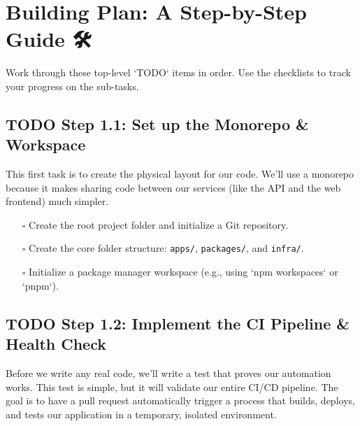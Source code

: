 \documentclass[11pt]{article}
\begin{document}
\section{Building Plan: A Step-by-Step Guide 🛠️}
\label{sec:org284168a}
Work through these top-level `TODO` items in order. Use the checklists to track your progress on the sub-tasks.
\subsection{{\bfseries\sffamily TODO} Step 1.1: Set up the Monorepo \& Workspace}
\label{sec:org1297e74}
This first task is to create the physical layout for our code. We'll use a monorepo because it makes sharing code between our services (like the API and the web frontend) much simpler.

\begin{itemize}
\item[{$\square$}] Create the root project folder and initialize a Git repository.
\item[{$\square$}] Create the core folder structure: \texttt{apps/}, \texttt{packages/}, and \texttt{infra/}.
\item[{$\square$}] Initialize a package manager workspace (e.g., using `npm workspaces` or `pnpm`).
\end{itemize}
\subsection{{\bfseries\sffamily TODO} Step 1.2: Implement the CI Pipeline \& Health Check}
\label{sec:org57ac915}
Before we write any real code, we'll write a test that proves our automation works. This test is simple, but it will validate our entire CI/CD pipeline. The goal is to have a pull request automatically trigger a process that builds, deploys, and tests our application in a temporary, isolated environment.
\end{document}
